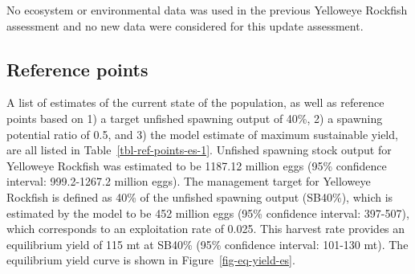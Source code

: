 \documentclass[
]{scrartcl}
\begin{document}
No ecosystem or environmental data was used in the previous Yelloweye
Rockfish assessment and no new data were considered for this update
assessment.

\subsection*{Reference points}\label{reference-points}

A list of estimates of the current state of the population, as well as
reference points based on 1) a target unfished spawning output of 40\%,
2) a spawning potential ratio of 0.5, and 3) the model estimate of
maximum sustainable yield, are all listed in
Table~\ref{tbl-ref-points-es-1}. Unfished spawning stock output for
Yelloweye Rockfish was estimated to be 1187.12 million eggs (95\%
confidence interval: 999.2-1267.2 million eggs). The management target
for Yelloweye Rockfish is defined as 40\% of the unfished spawning
output (SB40\%), which is estimated by the model to be 452 million eggs
(95\% confidence interval: 397-507), which corresponds to an
exploitation rate of 0.025. This harvest rate provides an equilibrium
yield of 115 mt at SB40\% (95\% confidence interval: 101-130 mt). The
equilibrium yield curve is shown in Figure~\ref{fig-eq-yield-es}.

\clearpage

\begingroup
\fontsize{9.0pt}{10.8pt}\selectfont
\end{document}
